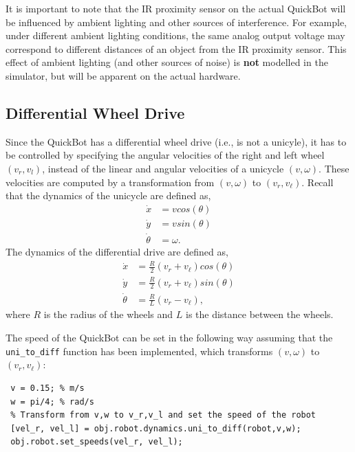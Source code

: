 \documentclass[10pt]{article}
\begin{document}
It is important to note that the IR proximity sensor on the actual QuickBot will be influenced by ambient lighting and other sources of interference. For example, under different ambient lighting conditions, the same analog output voltage may correspond to different distances of an object from the IR proximity sensor. This effect of ambient lighting (and other sources of noise) is \textbf{not} modelled in the simulator, but will be apparent on the actual hardware.

\subsection{Differential Wheel Drive}\label{diffdrive}
Since the QuickBot has a differential wheel drive (i.e., is not a unicyle), it has to be controlled by specifying the angular velocities of the right and left wheel $(v_r,v_l)$, instead of the linear and angular velocities of a unicycle $(v,\omega)$. These velocities are computed by a transformation from $(v,\omega)$ to $(v_r,v_\ell)$. Recall that the dynamics of the unicycle are defined as,
\begin{equation}
 \begin{split}
   \dot{x} &= vcos(\theta) \\
   \dot{y} &= vsin(\theta) \\
   \dot{\theta} &= \omega.
 \end{split}
\end{equation}
The dynamics of the differential drive are defined as,
\begin{equation}
 \begin{split}
  \dot{x} &= \frac{R}{2}(v_r+v_\ell)cos(\theta) \\
  \dot{y} &= \frac{R}{2}(v_r+v_\ell)sin(\theta) \\
  \dot{\theta} &= \frac{R}{L}(v_r-v_\ell),
 \end{split}
\end{equation}
where $R$ is the radius of the wheels and $L$ is the distance between the wheels.

The speed of the QuickBot can be set in the following way assuming that the \texttt{uni\_to\_diff} function has been implemented, which transforms $(v,\omega)$ to $(v_r,v_\ell)$:
\begin{verbatim}
 v = 0.15; % m/s
 w = pi/4; % rad/s
 % Transform from v,w to v_r,v_l and set the speed of the robot
 [vel_r, vel_l] = obj.robot.dynamics.uni_to_diff(robot,v,w);
 obj.robot.set_speeds(vel_r, vel_l);
\end{verbatim}
\end{document}
